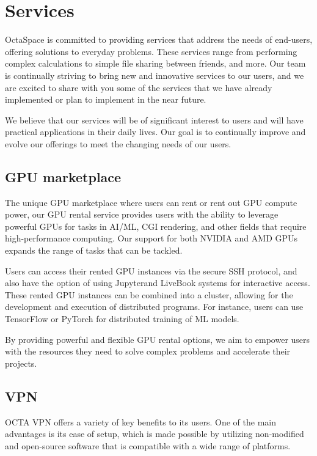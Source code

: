 \section{Services}

OctaSpace is committed to providing services that address the needs of end-users, offering solutions to everyday problems. These services range from performing complex calculations to simple file sharing between friends, and more. Our team is continually striving to bring new and innovative services to our users, and we are excited to share with you some of the services that we have already implemented or plan to implement in the near future.

We believe that our services will be of significant interest to users and will have practical applications in their daily lives. Our goal is to continually improve and evolve our offerings to meet the changing needs of our users. 

\subsection{GPU marketplace}

The unique GPU marketplace where users can rent or rent out GPU compute power, our GPU rental service provides users with the ability to leverage powerful GPUs for tasks in AI/ML, CGI rendering, and other fields that require high-performance computing. Our support for both NVIDIA and AMD GPUs expands the range of tasks that can be tackled.

Users can access their rented GPU instances via the secure SSH protocol, and also have the option of using Jupyter\cite{jupyter}and LiveBook\cite{livebook} systems for interactive access. These rented GPU instances can be combined into a cluster, allowing for the development and execution of distributed programs. For instance, users can use TensorFlow or PyTorch for distributed training of ML models.

By providing powerful and flexible GPU rental options, we aim to empower users with the resources they need to solve complex problems and accelerate their projects.

\subsection{VPN}

OCTA VPN\cite{VPN} offers a variety of key benefits to its users.
One of the main advantages is its ease of setup, which is made possible by utilizing non-modified and open-source software that is compatible with a wide range of platforms.

